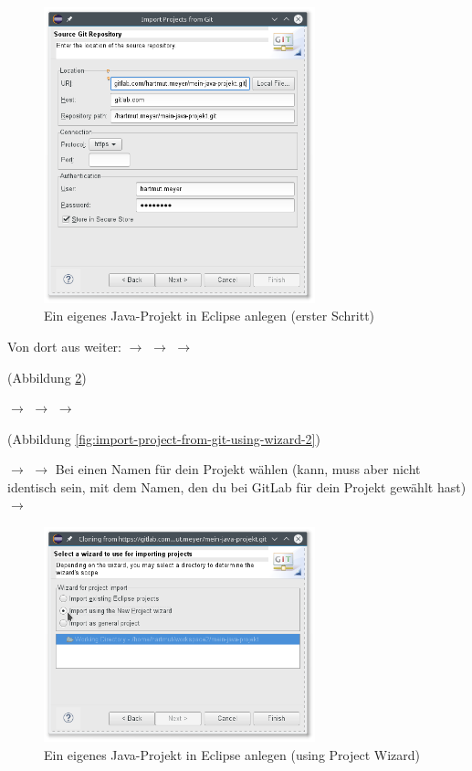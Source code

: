 \begin{figure}[h]
  \centering
   \includegraphics[width=0.70\textwidth]{./inf/SEKII/01_Vorbereitung/Import_Project_from_Git.png}
   \caption{Ein eigenes Java-Projekt in Eclipse anlegen (erster Schritt)}
   \label{fig:import-project-from-git}
\end{figure}

Von dort aus weiter: $\rightarrow$  $\rightarrow$ 
$\rightarrow$  

(Abbildung \ref{fig:import-project-from-git-using-wizard-1})

$\rightarrow$  $\rightarrow$  $\rightarrow$

(Abbildung \ref{fig:import-project-from-git-using-wizard-2})

$\rightarrow$   $\rightarrow$ Bei  einen Namen
für dein Projekt wählen (kann, muss aber nicht identisch sein, mit dem Namen,
den du bei GitLab für dein Projekt gewählt hast)  $\rightarrow$

\begin{figure}[h]
  \centering
   \includegraphics[width=0.70\textwidth]{./inf/SEKII/01_Vorbereitung/Import_Project_from_Git_using_Project_Wizard_1.png}
   \caption{Ein eigenes Java-Projekt in Eclipse anlegen (using Project Wizard)}
   \label{fig:import-project-from-git-using-wizard-1}
\end{figure}

